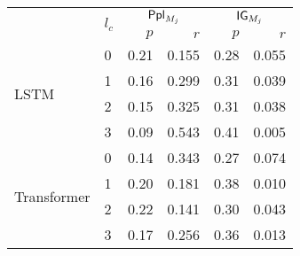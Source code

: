 \begin{tabular}{llrrrr}
\toprule
    & \multirow{2}{*}{$l_c$} & \multicolumn{2}{c}{$\mathsf{Ppl}_{M_j}$} & \multicolumn{2}{c}{$\mathsf{IG}_{M_j}$} \\
                              &       &         $p$ &            $r$ &           $p$ &          $r$ \\
\midrule
\multirow{4}{*}{LSTM}         & 0     &        0.21 &         0.155 &          0.28 &        0.055 \\
                              & 1     &        0.16 &         0.299 &          0.31 &        0.039 \\
                              & 2     &        0.15 &         0.325 &          0.31 &        0.038 \\
                              & 3     &        0.09 &         0.543 &          0.41 &        0.005 \\
                              \midrule
\multirow{4}{*}{Transformer}  & 0     &        0.14 &         0.343 &          0.27 &        0.074 \\
                              & 1     &        0.20 &         0.181 &          0.38 &        0.010 \\
                              & 2     &        0.22 &         0.141 &          0.30 &        0.043 \\
                              & 3     &        0.17 &         0.256 &          0.36 &        0.013 \\
\bottomrule
\end{tabular}

